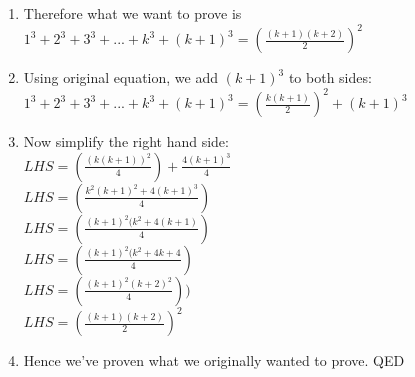 \documentclass[11pt,letterpaper]{article}
\begin{document}
\begin{enumerate}
\begin{enumerate}
\begin{enumerate}
			\item Therefore what we want to prove is $1^3 + 2^3 + 3^3 + ... + k^3 + (k+1)^3 = (\frac{(k+1)(k+2)}{2})^2$
			\item Using original equation, we add $(k+1)^3$ to both sides:
			\\ $1^3 + 2^3 + 3^3 + ... + k^3 + (k+1)^3 = (\frac{k(k+1)}{2})^2 + (k+1)^3 $
			\item Now simplify the right hand side:
			\\ $LHS = (\frac{(k(k+1))^2}{4}) + \frac{4(k+1)^3}{4}$
			\\ $LHS = (\frac{k^2(k+1)^2 + 4(k+1)^3}{4})$
			\\ $LHS = (\frac{(k+1)^2(k^2 + 4(k+1)}{4})$
			\\ $LHS = (\frac{(k+1)^2(k^2 + 4k + 4}{4})$
			\\ $LHS = (\frac{(k+1)^2(k+2)^2}{4}))$
			\\ $LHS = (\frac{(k+1)(k+2)}{2})^2$
			\item Hence we've proven what we originally wanted to prove. QED
		\end{enumerate}
	\end{enumerate}
\end{enumerate}

\newpage
\end{document}
